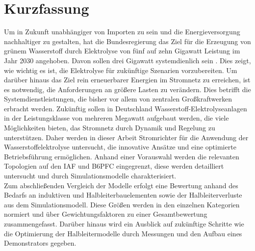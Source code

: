 \chapter{Kurzfassung}
Um in Zukunft unabhängiger von Importen zu sein und die Energieversorgung nachhaltiger zu gestalten, hat die Bundesregierung das Ziel für die Erzeugung von grünem Wasserstoff durch Elektrolyse von fünf auf zehn Gigawatt Leistung im Jahr 2030 angehoben. Davon sollen drei Gigawatt systemdienlich sein \cite{BMWKH2}. Dies zeigt, wie wichtig es ist, die Elektrolyse für zukünftige Szenarien vorzubereiten.
Um darüber hinaus das Ziel rein erneuerbarer Energien im Stromnetz zu erreichen, ist es notwendig, die Anforderungen an größere Lasten zu verändern. Dies betrifft die Systemdienstleistungen, die bisher vor allem von zentralen Großkraftwerken erbracht werden. Zukünftig sollen in Deutschland Wasserstoff-Elektrolyseanlagen in der Leistungsklasse von mehreren Megawatt aufgebaut werden, die viele Möglichkeiten bieten, das Stromnetz durch Dynamik und Regelung zu unterstützen. Daher werden in dieser Arbeit Stromrichter für die Anwendung der Wasserstoffelektrolyse untersucht, die innovative Ansätze und eine optimierte Betriebsführung ermöglichen. Anhand einer Vorauswahl werden die relevanten Topologien auf den \gls{IAF} und \gls{B6PFC} eingegrenzt, diese werden detailliert untersucht und durch Simulationsmodelle charakterisiert.\\
Zum abschließenden Vergleich der Modelle erfolgt eine Bewertung anhand des Bedarfs an induktiven und Halbleiterbauelementen sowie der Halbleiterverluste aus dem Simulationsmodell. Diese Größen werden in den einzelnen Kategorien normiert und über Gewichtungsfaktoren zu einer Gesamtbewertung zusammengefasst. Darüber hinaus wird ein Ausblick auf zukünftige Schritte wie die Optimierung der Halbleitermodelle durch Messungen und den Aufbau eines Demonstrators gegeben.

